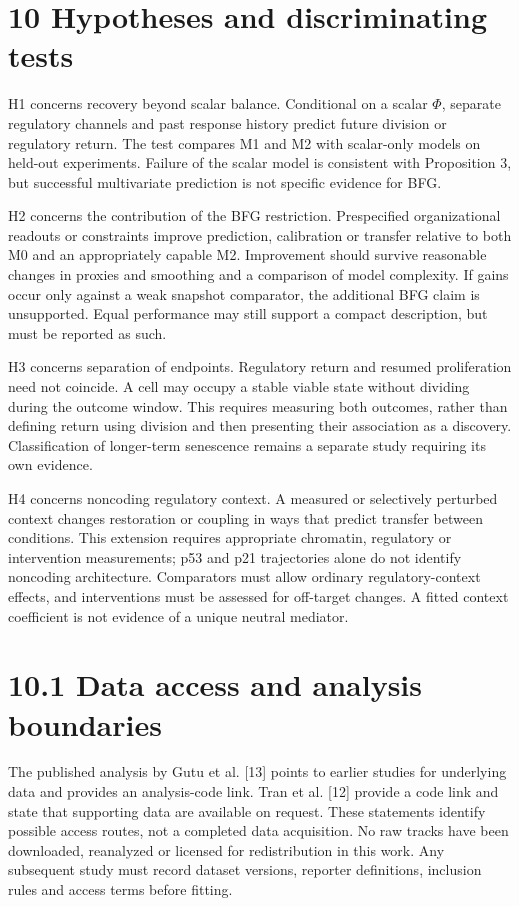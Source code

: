 \documentclass[11pt,a4paper]{article}
\begin{document}
\section*{10 Hypotheses and discriminating tests}
H1 concerns recovery beyond scalar balance. Conditional on a scalar $\Phi$, separate regulatory channels and past response history predict future division or regulatory return. The test compares M1 and M2 with scalar-only models on held-out experiments. Failure of the scalar model is consistent with Proposition 3, but successful multivariate prediction is not specific evidence for BFG.

H2 concerns the contribution of the BFG restriction. Prespecified organizational readouts or constraints improve prediction, calibration or transfer relative to both M0 and an appropriately capable M2. Improvement should survive reasonable changes in proxies and smoothing and a comparison of model complexity. If gains occur only against a weak snapshot comparator, the additional BFG claim is unsupported. Equal performance may still support a compact description, but must be reported as such.

H3 concerns separation of endpoints. Regulatory return and resumed proliferation need not coincide. A cell may occupy a stable viable state without dividing during the outcome window. This requires measuring both outcomes, rather than defining return using division and then presenting their association as a discovery. Classification of longer-term senescence remains a separate study requiring its own evidence.

H4 concerns noncoding regulatory context. A measured or selectively perturbed context changes restoration or coupling in ways that predict transfer between conditions. This extension requires appropriate chromatin, regulatory or intervention measurements; p53 and p21 trajectories alone do not identify noncoding architecture. Comparators must allow ordinary regulatory-context effects, and interventions must be assessed for off-target changes. A fitted context coefficient is not evidence of a unique neutral mediator.

\section*{10.1 Data access and analysis boundaries}
The published analysis by Gutu et al. [13] points to earlier studies for underlying data and provides an analysis-code link. Tran et al. [12] provide a code link and state that supporting data are available on request. These statements identify possible access routes, not a completed data acquisition. No raw tracks have been downloaded, reanalyzed or licensed for redistribution in this work. Any subsequent study must record dataset versions, reporter definitions, inclusion rules and access terms before fitting.
\end{document}
